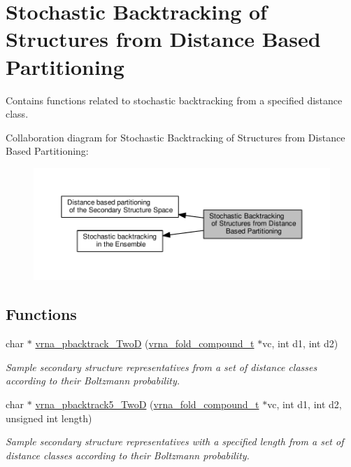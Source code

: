 \hypertarget{group__kl__neighborhood__stochbt}{}\section{Stochastic Backtracking of Structures from Distance Based Partitioning}
\label{group__kl__neighborhood__stochbt}


Contains functions related to stochastic backtracking from a specified distance class.  


Collaboration diagram for Stochastic Backtracking of Structures from Distance Based Partitioning\+:
\nopagebreak
\begin{figure}[H]
\begin{center}
\leavevmode
\includegraphics[width=350pt]{group__kl__neighborhood__stochbt}
\end{center}
\end{figure}
\subsection*{Functions}
\begin{DoxyCompactItemize}
\item 
char $\ast$ \hyperlink{group__kl__neighborhood__stochbt_ga14aceef73f83bbde77bb3a0ca06c9d13}{vrna\+\_\+pbacktrack\+\_\+\+Two\+D} (\hyperlink{group__fold__compound_ga1b0cef17fd40466cef5968eaeeff6166}{vrna\+\_\+fold\+\_\+compound\+\_\+t} $\ast$vc, int d1, int d2)
\begin{DoxyCompactList}\small\item\em Sample secondary structure representatives from a set of distance classes according to their Boltzmann probability. \end{DoxyCompactList}\item 
char $\ast$ \hyperlink{group__kl__neighborhood__stochbt_ga6504913303bc325659c365d5f59b41e0}{vrna\+\_\+pbacktrack5\+\_\+\+Two\+D} (\hyperlink{group__fold__compound_ga1b0cef17fd40466cef5968eaeeff6166}{vrna\+\_\+fold\+\_\+compound\+\_\+t} $\ast$vc, int d1, int d2, unsigned int length)
\begin{DoxyCompactList}\small\item\em Sample secondary structure representatives with a specified length from a set of distance classes according to their Boltzmann probability. \end{DoxyCompactList}\end{DoxyCompactItemize}


